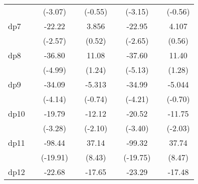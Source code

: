 {\begin{tabular}{l*{8}{c}}
            &                     &     (-3.07)         &                     &     (-0.55)         &                     &     (-3.15)         &                     &     (-0.56)         \\
[1em]
dp7         &                     &      -22.22\sym{*}  &                     &       3.856         &                     &      -22.95\sym{**} &                     &       4.107         \\
            &                     &     (-2.57)         &                     &      (0.52)         &                     &     (-2.65)         &                     &      (0.56)         \\
[1em]
dp8         &                     &      -36.80\sym{***}&                     &       11.08         &                     &      -37.60\sym{***}&                     &       11.40         \\
            &                     &     (-4.99)         &                     &      (1.24)         &                     &     (-5.13)         &                     &      (1.28)         \\
[1em]
dp9         &                     &      -34.09\sym{***}&                     &      -5.313         &                     &      -34.99\sym{***}&                     &      -5.044         \\
            &                     &     (-4.14)         &                     &     (-0.74)         &                     &     (-4.21)         &                     &     (-0.70)         \\
[1em]
dp10        &                     &      -19.79\sym{**} &                     &      -12.12\sym{*}  &                     &      -20.52\sym{***}&                     &      -11.75\sym{*}  \\
            &                     &     (-3.28)         &                     &     (-2.10)         &                     &     (-3.40)         &                     &     (-2.03)         \\
[1em]
dp11        &                     &      -98.44\sym{***}&                     &       37.14\sym{***}&                     &      -99.32\sym{***}&                     &       37.74\sym{***}\\
            &                     &    (-19.91)         &                     &      (8.43)         &                     &    (-19.75)         &                     &      (8.47)         \\
[1em]
dp12        &                     &      -22.68\sym{***}&                     &      -17.65\sym{***}&                     &      -23.29\sym{***}&                     &      -17.48\sym{***}\\

\end{tabular}}

